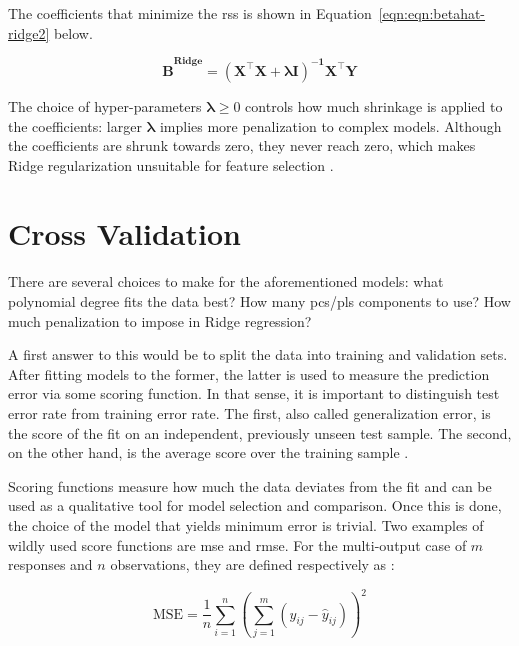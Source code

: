The coefficients that minimize the \acrshort{rss} is shown in Equation~\ref{eqn:eqn:betahat-ridge2} below.

\begin{equation}
	\label{eqn:eqn:betahat-ridge2}
	\mathbf{\hat{B}^\text{Ridge}} = \mathbf{(X^\intercal X + \boldsymbol{\lambda}  I )^{-1} X^\intercal Y}
\end{equation}

The choice of hyper-parameters $\boldsymbol{\lambda} \geq 0$ controls how much shrinkage is applied to the coefficients: larger $\boldsymbol{\lambda}$ implies more penalization to complex models. Although the coefficients are shrunk towards zero, they never reach zero, which makes Ridge regularization unsuitable for feature selection \parencite{friedman2001}.

\section{Cross Validation}
\label{sec:crossval}

There are several choices to make for the aforementioned models: what polynomial degree fits the data best? How many \acrshort{pc}s/\acrshort{pls} components to use? How much penalization to impose in Ridge regression? 

A first answer to this would be to split the data into training and validation sets. After fitting models to the former, the latter is used to measure the prediction error via some scoring function. In that sense, it is important to distinguish test error rate from training error rate. The first, also called generalization error, is the score of the fit on an independent, previously unseen test sample. The second, on the other hand, is the average score over the training sample \parencite{friedman2001}.

Scoring functions measure how much the data deviates from the fit and can be used as a qualitative tool for model selection and comparison.  Once this is done, the choice of the model that yields minimum error is trivial. Two examples of wildly used score functions are \acrfull{mse} and \acrfull{rmse}. For the multi-output case of $m$ responses and $n$ observations, they are defined respectively as :

\begin{equation} 
	\label{eqn:mse}
	\text{MSE} = \frac{1}{n}  \sum_{i=1}^{n} \left(\sum_{j=1}^{m}(y_{ij} - \hat{y}_{ij})\right)^2
\end{equation}

